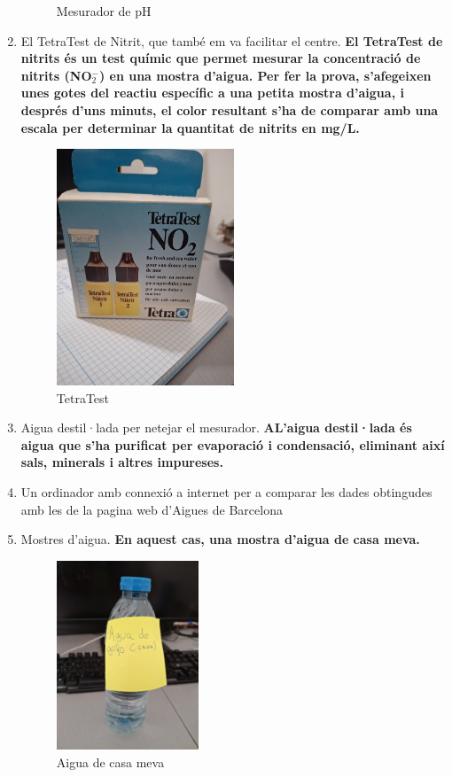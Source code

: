\begin{enumerate}
\begin{figure}[h!]
\caption{Mesurador de pH}
\label{fig:fotoMesuradorPH}%
\end{figure}
 \item El TetraTest de Nitrit, que també em va facilitar el centre. \textbf{El TetraTest de nitrits és un test químic que permet mesurar la concentració de nitrits (NO$_2^-$) en una mostra d’aigua. Per fer la prova, s’afegeixen unes gotes del reactiu específic a una petita mostra d’aigua, i després d’uns minuts, el color resultant s’ha de comparar amb una escala per determinar la quantitat de nitrits en mg/L.}
 \begin{figure}[h!]
\centering
\includegraphics[width=0.5\textwidth, angle=270]{./Figures/TetraTest.png}
\caption{TetraTest}
\label{fig:TetraTestdeNitrit}
\end{figure}
 \item Aigua destil·lada per netejar el mesurador. \textbf{AL’aigua destil·lada és aigua que s’ha purificat per evaporació i condensació, eliminant així sals, minerals i altres impureses.}
 \item Un ordinador amb connexió a internet per a comparar les dades obtingudes amb les de la pagina web d'Aigues de Barcelona \cite{qualitatAigua}
 \item Mostres d'aigua. \textbf{En aquest cas, una mostra d'aigua de casa meva.}
 \begin{figure}[h!]
\centering
\includegraphics[width=0.4\textwidth, angle=270]{./Figures/aguadecasa.png}
\caption{Aigua de casa meva}
\label{fig:fotoAiguaCasaMeva}
\end{figure}
\end{enumerate}

